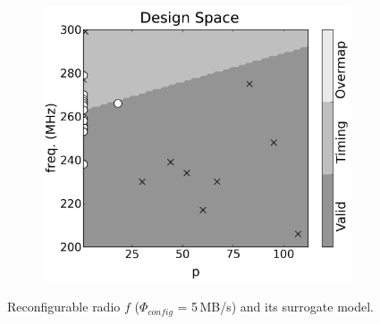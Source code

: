 \documentclass[runningheads,a4paper]{llncs}
\begin{document}
\begin{figure}
\begin{subfigure}{0.31\textwidth}
        \end{subfigure}
        \begin{subfigure}{0.31\textwidth}
                \centering
                \includegraphics[width=\textwidth]{./figs/svm009_11.png}
        \end{subfigure}
        \caption{Reconfigurable radio $f$ ($\Phi_{config}$ = 5\,MB/s) and its surrogate model.}\label{fig:fitness_2}
\end{figure}

\end{document}
